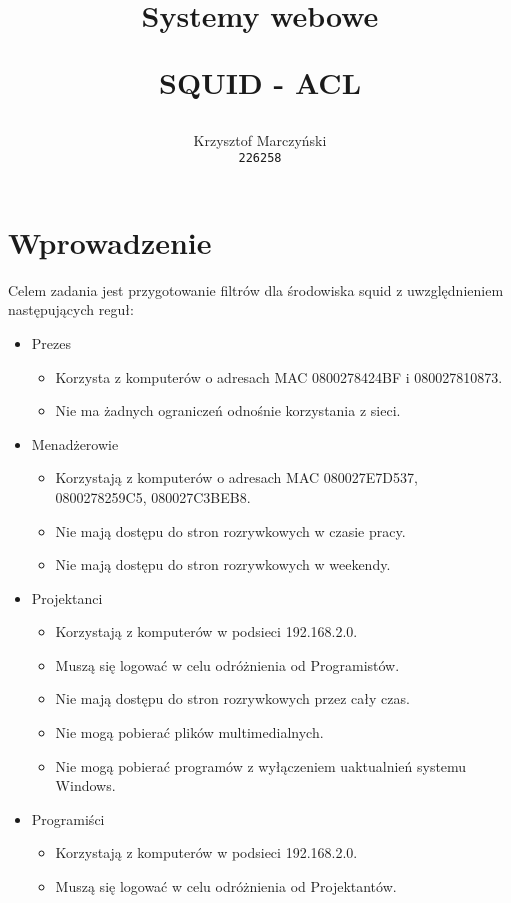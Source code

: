 \documentclass{article}
\title{Systemy webowe\item{SQUID - ACL}}
\author{
\rule[40pt]{0pt}{0pt}
  Krzysztof Marczyński\\
  \texttt{226258}
}
\date{\rule[40pt]{0pt}{0pt} 23.11.2019}
\begin{document}
\maketitle

\newpage

\tableofcontents

\newpage
\section{Wprowadzenie}
Celem zadania jest przygotowanie filtrów dla środowiska squid z uwzględnieniem następujących reguł:

\begin{itemize}
    \item Prezes
    \begin{itemize}
        \item Korzysta z komputerów o adresach MAC 0800278424BF i 080027810873.
        \item Nie ma żadnych ograniczeń odnośnie korzystania z sieci.
    \end{itemize}
    \item Menadżerowie
    \begin{itemize}
        \item Korzystają z komputerów o adresach MAC 080027E7D537, 0800278259C5, 080027C3BEB8.
        \item Nie mają dostępu do stron rozrywkowych w czasie pracy.
        \item Nie mają dostępu do stron rozrywkowych w weekendy.
    \end{itemize}
    \item Projektanci
    \begin{itemize}
        \item Korzystają z komputerów w podsieci 192.168.2.0.
        \item Muszą się logować w celu odróżnienia od Programistów.
        \item Nie mają dostępu do stron rozrywkowych przez cały czas.
        \item Nie mogą pobierać plików multimedialnych.
        \item Nie mogą pobierać programów z wyłączeniem uaktualnień systemu Windows.
    \end{itemize}
    \item Programiści
    \begin{itemize}
        \item Korzystają z komputerów w podsieci 192.168.2.0.
        \item Muszą się logować w celu odróżnienia od Projektantów.

\end{itemize}
\end{itemize}
\end{document}
